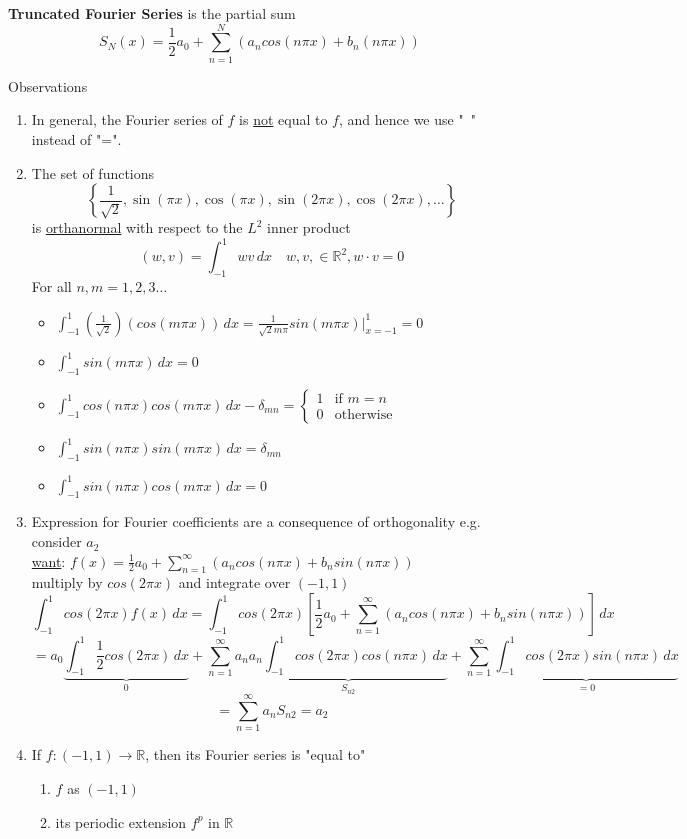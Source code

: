 \begin{definition}
    \textbf{Truncated Fourier Series} is the partial sum
    \[S_N(x) = \frac{1}{2}a_0 + \sum_{n=1}^{N}(a_n cos(n\pi x) + b_n (n\pi x))\]
\end{definition}
Observations
\begin{enumerate}
    \item In general, the Fourier series of $f$ is \underline{not} equal to $f$, and hence we use "~" instead of "=".
    \item The set of functions
    \[\left\{\frac{1}{\sqrt{2}}, \sin(\pi x), \cos (\pi x), \sin(2\pi x), \cos(2\pi x), \dots\right\}\]
    is \underline{orthanormal} with respect to the $L^2$ inner product
    \[(w, v) = \int_{-1}^{1}wv\,dx \quad w,v,\in \mathbb{R}^2, w\cdot v = 0\]
    For all $n,m = 1,2,3\dots$
    \begin{itemize}
        \item $\int_{-1}^{1} (\frac{1}{\sqrt{2}})(cos(m \pi x))\,dx = \frac{1}{\sqrt{2}m\pi}sin(m\pi x)|^1_{x=-1} = 0$
        \item $\int_{-1}^{1} sin (m\pi x)\,dx = 0$
        \item $\int_{-1}^{1} cos(n\pi x) cos(m\pi x)\,dx - \delta_{mn} = \begin{cases}
            1 & \text{if }m=n \\
            0& \text{otherwise}
        \end{cases}$
        \item $\int_{-1}^{1} sin(n\pi x)sin(m\pi x)\,dx = \delta_{mn}$
        \item $\int_{-1}^{1} sin(n\pi x)cos(m\pi x)\,dx = 0$
    \end{itemize}
    \item Expression for Fourier coefficients are a consequence of orthogonality
    e.g. consider $a_2$
    \\ \underline{want}: $f(x) = \frac{1}{2}a_0 + \sum_{n=1}^{\infty} (a_n cos (n \pi x) + b_n sin(n\pi x))$
    \\ multiply by $cos(2\pi x)$ and integrate over $(-1,1)$
    \[\int_{-1}^{1}cos(2\pi x)f(x)  \,dx = \int_{-1}^{1}cos(2\pi x)[\frac{1}{2}a_0 + \sum_{n=1}^{\infty} (a_n cos (n\pi x) + b_n sin(n\pi x))]  \,dx  \]
    \[ = a_0 \underbrace{\int_{-1}^{1} \frac{1}{2}cos(2\pi x) \,dx }_{0} + \sum_{n=1}^{\infty} a_n \underbrace{a_n \int_{-1}^{1} cos(2\pi x)cos(n \pi x) \,dx }_{S_{n2}} + \sum_{n=1}^{\infty}\underbrace{\int_{-1}^{1} cos(2\pi x)sin(n \pi x) \,dx }_{=0}\]
    \[ = \sum_{n=1}^{\infty} a_n S_{n2} = a_2\]
    \item If $f:(-1, 1) \rightarrow \mathbb{R}$, then its Fourier series is "equal to"
    \begin{enumerate}[label = (\roman*)]
        \item $f$ as $(-1,1)$
        \item its periodic extension $f^p$ in $\mathbb{R}$
    \end{enumerate}
\end{enumerate}
